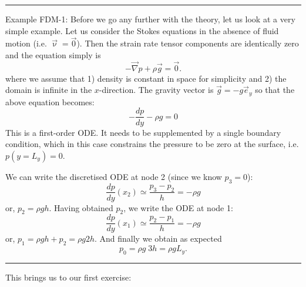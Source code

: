 \begin{center}
\begin{minipage}[t]{0.77\textwidth}
\par\noindent\rule{\textwidth}{0.4pt}
{\color{blue}Example FDM-1:} Before we go any further with the theory, let us look at a very simple example. 
Let us consider the Stokes equations in the absence of fluid motion (i.e. $\vec\upnu=\vec 0$).
Then the strain rate tensor components are identically zero and the equation simply is 
\begin{equation}
-\vec\nabla p + \rho \vec{g} = \vec 0.
\end{equation}
where we assume that 1) density is constant in space for simplicity and 2)
the domain is infinite in the $x$-direction.
The gravity vector is $\vec{g}=-g \vec{e}_y$ so that the above equation 
becomes:
\begin{equation}
-\frac{dp}{dy} - \rho g = 0
\end{equation}
This is a first-order ODE. It needs to be supplemented by a single boundary condition, 
which in this case constrains the pressure to be zero at the surface, i.e. $p(y=L_y)=0$.

\begin{center}

\end{center}

We can write the discretised ODE at node 2 (since we know $p_3=0$):
\begin{equation}
\frac{dp}{dy}(x_2) \simeq \frac{p_3-p_2}{h} = -\rho g
\end{equation}
or, $p_2=\rho g h$. Having obtained $p_2$, we write the ODE at node 1:
\begin{equation}
\frac{dp}{dy}(x_1) \simeq \frac{p_2-p_1}{h} = -\rho g
\end{equation}
or, $p_1= \rho g h + p_2 = \rho g 2h$. And finally we obtain as expected
\begin{equation}
p_0 = \rho g \; 3h = \rho g L_y.
\end{equation}

\par\noindent\rule{\textwidth}{0.4pt}
\end{minipage}
\end{center}

This brings us to our first exercise:


